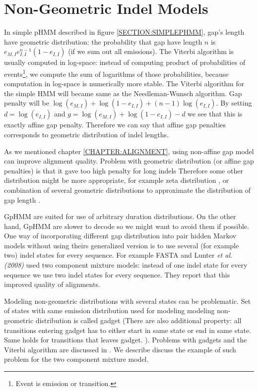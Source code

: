 \section{Non-Geometric Indel Models}
In simple pHMM described in figure \ref{SECTION:SIMPLEPHMM}, gap's length have
geometric distribution: the probability that gap have length $n$ is
$e_{M,I}e_{I,I}^{n-1}(1-e_{I,I})$ (if we sum out all emissions). The Viterbi
algorithm is usually computed in log-space: instead of computing product of
probabilities of events\footnote{Event is emission or transition.}, we compute
the sum of logarithms of those probabilities, because computation in log-space
is numerically more stable. The Viterbi algorithm for the simple HMM
will became same as the Needleman-Wunsch algorithm.  Gap penalty will be
$\log(e_{M,I})+\log(1-e_{I,I})+(n-1)\log(e_{I,I})$. By setting $d=\log(e_{I,I})$
and $g=\log(e_{M,I})+\log(1-e_{I,I})-d$ we see that this is exactly affine gap
penalty. Therefore we can say that affine gap penalties corresponds to geometric
distribution of indel lengths.

As we mentioned chapter \ref{CHAPTER:ALIGNMENT}, using non-affine gap model can
improve alignment quality.  Problem with geometric distribution (or affine gap
penalties) is that it gave too high penalty for long indels \cite{} Therefore
some other distribution might be more appropriate, for example zeta distribution
\cite{Cartwright2009}, or combination of several geometric distributions to
approximate the distribution of gap length \cite{Gill2004,Gill2006}.

GpHMM are suited for use of arbitrary duration distributions.
On the other hand, GpHMM are slower to decode so we might want to avoid them if
possible.  One way of incorporating different gap distribution into pair hidden
Markov models without using theirs generalized version is to use several (for
example two) indel states for every sequence. For example FASTA
\cite{Bradley2009} and
Lunter {\it et al. (2008)} used two component mixture models: instead of one
indel state for every sequence we use two indel states for every sequence. They
report that this improved quality of alignments.
\nocite{Lunter2008}

Modeling non-geometric distributions with several states can be problematic. Set
of states with same emission distribution used for modeling modeling
non-geometric distribution is called gadget (There are also additional
property: all transitions entering gadget has to either start in same state or
end in same state. Same holds for transitions that leaves gadget. ). Problems
with gadgets and the Viterbi algorithm are discussed in \cite{Vinar2005}. We
describe discuss the example of such problem for the two component mixture
model.

